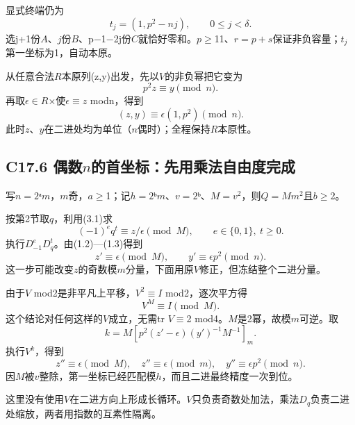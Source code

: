 {显式终端仍为} \[
t_j=(1,p^2-nj),\qquad0\le j<\delta.
\] {选j+1份\ensuremath{A}、\ensuremath{j}份\ensuremath{B}、p−1−2j份\ensuremath{C}就恰好零和。\ensuremath{p}\ensuremath{\ge}11、\ensuremath{r=p+s}保证非负容量；\ensuremath{t_{j}}第一坐标为1，自动本原。}

{从任意合法\ensuremath{R}本原列(z,y)出发，先以\ensuremath{V}的非负幂把它变为} \[
p^2z\equiv y\pmod n.
\] {再取\ensuremath{\epsilon }\ensuremath{\in}\ensuremath{R}×使\ensuremath{\epsilon }\ensuremath{\equiv}\ensuremath{z}} {modn，得到} \[
(z,y)\equiv\epsilon(1,p^2)\pmod n.
\tag{C17.5.1}
\] {此时\ensuremath{z}、\ensuremath{y}在二进处均为单位（\ensuremath{n}偶时）；全程保持\ensuremath{R}本原性。}

\subsection*{\texorpdfstring{{C17.6} {偶数\ensuremath{n}的首坐标：先用乘法自由度完成}}{C17.6 偶数的首坐标：先用乘法自由度完成}}\label{C17-h128}

{写\ensuremath{n=2}ᵃ\ensuremath{m}，\ensuremath{m}奇，\ensuremath{a}\ensuremath{\ge}1；记\ensuremath{h=2}ᵇ\ensuremath{m}、\ensuremath{v=2}ᵇ、\ensuremath{M=v^{2}}，则\ensuremath{Q=Mm^{2}}且\ensuremath{b}\ensuremath{\ge}2。}

{按第2节取\ensuremath{q}，利用(3.1)求} \[
(-1)^e q^t\equiv z/\epsilon\pmod M,
\qquad e\in\{0,1\},\ t\ge0.
\] {执行\ensuremath{D_{-1}^{e}D_{q}^{t}}。由(1.2)---(1.3)得到} \[
z'\equiv\epsilon\pmod M,\qquad y'\equiv\epsilon p^2\pmod n.
\tag{C17.6.1}
\] {这一步可能改变\ensuremath{z}的奇数模\ensuremath{m}分量，下面用原\ensuremath{V}修正，但冻结整个二进分量。}

{由于\ensuremath{V}} {mod2是非平凡上平移，\ensuremath{V^{2}}\ensuremath{\equiv}\ensuremath{I}} {mod2，逐次平方得} \[
\boxed{V^M\equiv I\pmod M.}
\tag{C17.6.2}
\] {这个结论对任何这样的\ensuremath{V}成立，无需tr} {\ensuremath{V}\ensuremath{\equiv}2} {mod4。\ensuremath{M}是2幂，故模\ensuremath{m}可逆。取} \[
k=M\left[p^2(z'-\epsilon)(y')^{-1}M^{-1}\right]_m.
\] {执行\ensuremath{V^{k}}，得到} \[
\boxed{z''\equiv\epsilon\pmod M,\quad
z''\equiv\epsilon\pmod m,\quad
y''\equiv\epsilon p^2\pmod n.}
\tag{C17.6.3}
\] {因\ensuremath{M}被\ensuremath{v}整除，第一坐标已经匹配模\ensuremath{h}，而且二进最终精度一次到位。}

{这里没有使用\ensuremath{V}在二进方向上形成长循环。\ensuremath{V}只负责奇数处加法，乘法\ensuremath{D_{q}}负责二进处缩放，两者用指数的互素性隔离。}

